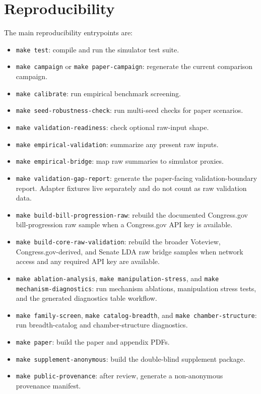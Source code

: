 \documentclass[manuscript,review,anonymous]{acmart}
\begin{document}
\section{Reproducibility}

The main reproducibility entrypoints are:

\begin{itemize}
  \item \texttt{make test}: compile and run the simulator test suite.
  \item \texttt{make campaign} or \texttt{make paper-campaign}: regenerate the current comparison campaign.
  \item \texttt{make calibrate}: run empirical benchmark screening.
  \item \texttt{make seed-robustness-check}: run multi-seed checks for paper scenarios.
  \item \texttt{make validation-readiness}: check optional raw-input shape.
  \item \texttt{make empirical-validation}: summarize any present raw inputs.
  \item \texttt{make empirical-bridge}: map raw summaries to simulator proxies.
  \item \texttt{make validation-gap-report}: generate the paper-facing validation-boundary report. Adapter fixtures live separately and do not count as raw validation data.
  \item \texttt{make build-bill-progression-raw}: rebuild the documented Congress.gov bill-progression raw sample when a Congress.gov API key is available.
  \item \texttt{make build-core-raw-validation}: rebuild the broader Voteview, Congress.gov-derived, and Senate LDA raw bridge samples when network access and any required API key are available.
  \item \texttt{make ablation-analysis}, \texttt{make manipulation-stress}, and \texttt{make mechanism-diagnostics}: run mechanism ablations, manipulation stress tests, and the generated diagnostics table workflow.
  \item \texttt{make family-screen}, \texttt{make catalog-breadth}, and \texttt{make chamber-structure}: run breadth-catalog and chamber-structure diagnostics.
  \item \texttt{make paper}: build the paper and appendix PDFs.
  \item \texttt{make supplement-anonymous}: build the double-blind supplement package.
  \item \texttt{make public-provenance}: after review, generate a non-anonymous provenance manifest.
\end{itemize}
\end{document}
